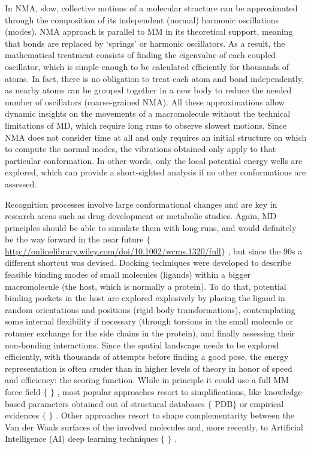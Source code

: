 In NMA, slow, collective motions of a molecular structure can be approximated through the composition of its independent (normal) harmonic oscillations (modes). NMA approach is parallel to MM in its theoretical support, meaning that bonds are replaced by ‘springs’ or harmonic oscillators. As a result, the mathematical treatment consists of finding the eigenvalue of each coupled oscillator, which is simple enough to be calculated efficiently for thousands of atoms. In fact, there is no obligation to treat each atom and bond independently, as nearby atoms can be grouped together in a new body to reduce the needed number of oscillators (coarse-grained NMA). All these approximations allow dynamic insights on the movements of a macromolecule without the technical limitations of MD, which require long runs to observe slowest motions. Since NMA does not consider time at all and only requires an initial structure on which to compute the normal modes, the vibrations obtained only apply to that particular conformation. In other words, only the local potential energy wells are explored, which can provide a short-sighted analysis if no other conformations are assessed.

Recognition processes involve large conformational changes and are key in research areas such as drug development or metabolic studies. Again, MD principles should be able to simulate them with long runs, and would definitely be the way forward in the near future $ \{ $ \href{http://onlinelibrary.wiley.com/doi/10.1002/wcms.1320/full}{http://onlinelibrary.wiley.com/doi/10.1002/wcms.1320/full}$ \} $ , but since the 90s a different shortcut was devised. Docking techniques were developed to describe feasible binding modes of small molecules (ligands) within a bigger macromolecule (the host, which is normally a protein). To do that, potential binding pockets in the host are explored explosively by placing the ligand in random orientations and positions (rigid body transformations), contemplating some internal flexibility if necessary (through torsions in the small molecule or rotamer exchange for the side chains in the protein), and finally assessing their non-bonding interactions. Since the spatial landscape needs to be explored efficiently, with thousands of attempts before finding a good pose, the energy representation is often cruder than in higher levels of theory in honor of speed and efficiency: the scoring function. While in principle it could use a full MM force field $ \{ $ $ \} $ , most popular approaches resort to simplifications, like knowledge-based parameters obtained out of structural databases $ \{ $ PDB$ \} $  or empirical evidences $ \{ $ $ \} $ . Other approaches resort to shape complementarity between the Van der Waals surfaces of the involved molecules and, more recently, to Artificial Intelligence (AI) deep learning techniques $ \{ $ $ \} $ .

